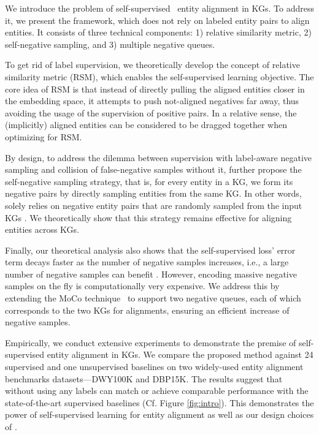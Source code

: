 We introduce the problem of self-supervised~\cite{liu2020self} entity alignment in KGs. 
To address it, we present the \solution framework, which does not rely on labeled entity pairs to align entities. 
It consists of three technical components: 1) relative similarity metric, 2) self-negative sampling, and 3) multiple negative queues. 

To get rid of label supervision, we theoretically develop the concept of relative similarity metric (RSM), which enables the self-supervised learning objective. 
The core idea of RSM is that instead of directly pulling the aligned entities closer in the embedding space, it attempts to push not-aligned negatives far away, thus avoiding the usage of the supervision of positive pairs. 
In a relative sense, the (implicitly) aligned entities can be considered to be dragged together when optimizing for RSM. 

By design, to address the dilemma between supervision with label-aware negative sampling and collision of false-negative samples without it, \solution further propose the self-negative sampling strategy, that is, for every entity in a KG, we form its negative pairs by directly sampling entities from the same KG. 
In other words, \solution solely relies on negative entity pairs that are randomly sampled from the input KGs . 
We theoretically show that this strategy remains effective for aligning entities across KGs. 


Finally, our theoretical analysis also shows that the self-supervised loss' error term decays faster as the number of negative samples increases, i.e., a large number of negative samples can benefit \solution. 
However, encoding massive negative samples on the fly is computationally very expensive. 
We address this by extending the MoCo technique~\cite{he2020momentum} to support two negative queues, each of which corresponds to the two KGs for alignments, ensuring an efficient increase of negative samples. 



Empirically, we conduct extensive experiments to demonstrate the premise of self-supervised entity alignment in KGs. 
We compare the proposed \solution method against 24 supervised and one unsupervised baselines on two widely-used entity alignment benchmarks datasets---DWY100K and DBP15K. 
The results suggest that \solution without using any labels can match or achieve comparable performance with the state-of-the-art supervised baselines (Cf.  Figure \ref{fig:intro}). 
This demonstrates the power of self-supervised learning for entity alignment as well as our design choices of \solution. 




























